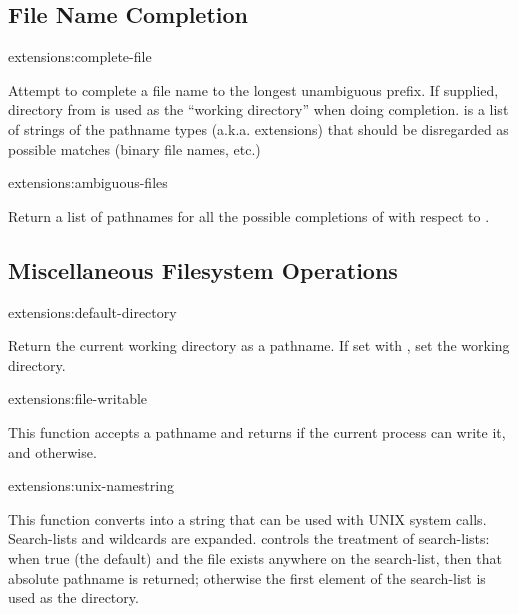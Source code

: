 \subsection{File Name Completion}

\begin{defun}{extensions:}{complete-file}{%
    }
  
  Attempt to complete a file name to the longest unambiguous prefix.
  If supplied, directory from  is used as the ``working
  directory'' when doing completion.   is a list of
  strings of the pathname types (a.k.a. extensions) that should be
  disregarded as possible matches (binary file names, etc.)
\end{defun}

\begin{defun}{extensions:}{ambiguous-files}{%
    }
  
  Return a list of pathnames for all the possible completions of
   with respect to .
\end{defun}


\subsection{Miscellaneous Filesystem Operations}

\begin{defun}{extensions:}{default-directory}{}
  
  Return the current working directory as a pathname.  If set with
  , set the working directory.
\end{defun}

\begin{defun}{extensions:}{file-writable}{}
  
  This function accepts a pathname and returns \true{} if the current
  process can write it, and \false{} otherwise.
\end{defun}

\begin{defun}{extensions:}{unix-namestring}{%
    }
  
  This function converts  into a string that can be used
  with UNIX system calls.  Search-lists and wildcards are expanded.
   controls the treatment of search-lists: when true
  (the default) and the file exists anywhere on the search-list, then
  that absolute pathname is returned; otherwise the first element of
  the search-list is used as the directory.
\end{defun}



